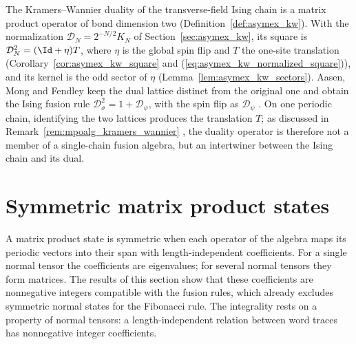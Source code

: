 \begin{remark}%
    \label{rem:mposym_kramers_wannier}
    The Kramers--Wannier duality of the transverse-field Ising chain is a
    matrix product operator of bond dimension two
    (Definition~\ref{def:asymex_kw}). With the normalization
    $\mathcal D_N=2^{-N/2}K_N$ of Section~\ref{sec:asymex_kw}, its square is
    $\mathcal D_N^2=(\Id+\eta)T$, where $\eta$ is the global spin flip and $T$
    the one-site translation (Corollary~\ref{cor:asymex_kw_square} and
    (\ref{eq:asymex_kw_normalized_square})), and its kernel is the odd sector
    of $\eta$ (Lemma~\ref{lem:asymex_kw_sectors}). Aasen, Mong and Fendley
    keep the dual lattice distinct from the original one and obtain the Ising
    fusion rule $\mathcal D_\sigma^2=1+\mathcal D_\psi$, with the spin flip
    as $\mathcal D_\psi$ \cite{Aasen2016Topological}. On one periodic chain,
    identifying the two lattices produces the translation $T$; as discussed in
    Remark~\ref{rem:mpoalg_kramers_wannier} \cite{Lootens2023Dualities}, the
    duality operator is therefore not a member of a single-chain fusion
    algebra, but an intertwiner between the Ising chain and its dual.
\end{remark}

\section{Symmetric matrix product states}%
\label{sec:mposym_symmetric}

A matrix product state is symmetric when each operator of the algebra maps
its periodic vectors into their span with length-independent coefficients.
For a single normal tensor the coefficients are eigenvalues; for several
normal tensors they form matrices. The results of this section show that
these coefficients are nonnegative integers compatible with the fusion rules,
which already excludes symmetric normal states for the Fibonacci rule. The
integrality rests on a property of normal tensors: a length-independent
relation between word traces has nonnegative integer coefficients.


